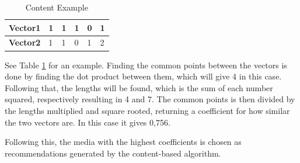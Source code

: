 \begin{table}[htb]
\centering
\begin{tabular}{|l||l|l|l|l|l|} \hline
	\textbf{Vector1} & 1 & 1 & 1 & 0 & 1 \\ \hline
	\textbf{Vector2} & 1 & 1 & 0 & 1 & 2 \\ \hline
\end{tabular}
\caption{Content Example}
\label{ContentEx}
\end{table}

See Table \ref{ContentEx} for an example. Finding the common points between the vectors is done by finding the dot product between them, which will give 4 in this case. Following that, the lengths will be found, which is the sum of each number squared, respectively resulting in 4 and 7. The common points is then divided by the lengths multiplied and square rooted, returning a coefficient for how similar the two vectors are. In this case it gives 0,756.

Following this, the media with the highest coefficients is chosen as recommendations generated by the content-based algorithm.